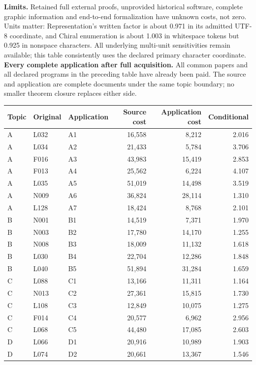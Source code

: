 \documentclass[11pt,a4paper]{article}
\newcommand{\tabsetup}{\small\setlength{\tabcolsep}{4pt}\renewcommand{\arraystretch}{1.12}}
\begin{document}
\textbf{Limits.} Retained full external proofs, unprovided historical software, complete graphic information and end-to-end formalization have unknown costs, not zero. Units matter: Representation's written factor is about 0.971 in its admitted UTF-8 coordinate, and Chiral enumeration is about 1.003 in whitespace tokens but 0.925 in nonspace characters. All underlying multi-unit sensitivities remain available; this table consistently uses the declared primary character coordinate.
\newpage
\textbf{Every complete application after full acquisition.}
All common papers and all declared programs in the preceding table have already been paid. The source and application are complete documents under the same topic boundary; no smaller theorem closure replaces either side.
\begin{center}\tabsetup\begin{tabular}{lllrrr}\toprule
Topic & Original & Application & Source cost & Application cost & Conditional\\\midrule
A & L032 & A1 & 16,558 & 8,212 & 2.016 \\
A & L034 & A2 & 21,433 & 5,784 & 3.706 \\
A & F016 & A3 & 43,983 & 15,419 & 2.853 \\
A & F013 & A4 & 25,562 & 6,224 & 4.107 \\
A & L035 & A5 & 51,019 & 14,498 & 3.519 \\
A & N009 & A6 & 36,824 & 28,114 & 1.310 \\
A & L128 & A7 & 18,424 & 8,768 & 2.101 \\
B & N001 & B1 & 14,519 & 7,371 & 1.970 \\
B & N003 & B2 & 17,780 & 14,170 & 1.255 \\
B & N008 & B3 & 18,009 & 11,132 & 1.618 \\
B & L030 & B4 & 22,704 & 12,286 & 1.848 \\
B & L040 & B5 & 51,894 & 31,284 & 1.659 \\
C & L088 & C1 & 13,166 & 11,311 & 1.164 \\
C & N013 & C2 & 27,361 & 15,815 & 1.730 \\
C & L108 & C3 & 12,849 & 10,075 & 1.275 \\
C & F014 & C4 & 20,577 & 6,962 & 2.956 \\
C & L068 & C5 & 44,480 & 17,085 & 2.603 \\
D & L066 & D1 & 20,916 & 10,989 & 1.903 \\
D & L074 & D2 & 20,661 & 13,367 & 1.546 \\

\end{tabular}
\end{center}
\end{document}
